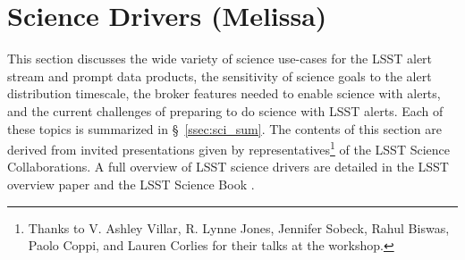 
\section{Science Drivers (Melissa)} \label{sec:science}





\medskip
This section discusses the wide variety of science use-cases for the LSST alert stream and prompt data products, the sensitivity of science goals to the alert distribution timescale, the broker features needed to enable science with alerts, and the current challenges of preparing to do science with LSST alerts.
Each of these topics is summarized in \S~\ref{ssec:sci_sum}.
The contents of this section are derived from invited presentations given by representatives\footnote{Thanks to V. Ashley Villar, R. Lynne Jones, Jennifer Sobeck, Rahul Biswas, Paolo Coppi, and Lauren Corlies for their talks at the workshop.} of the LSST Science Collaborations. 
A full overview of LSST science drivers are detailed in the LSST overview paper \citep{2019ApJ...873..111I} and the LSST Science Book \citep{2009arXiv0912.0201L}. 

